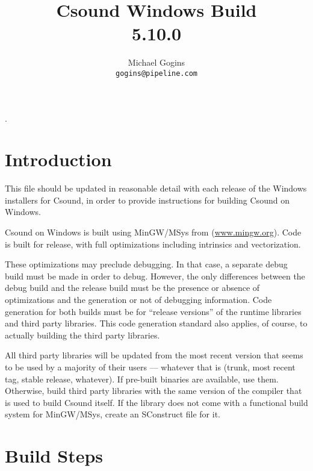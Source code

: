 \documentclass[11pt,letterpaper,onecolumn]{scrartcl}
\begin{document}
\begin{sloppypar}

.
\title{Csound Windows Build \\ 5.10.0}

\author{Michael Gogins \\ \texttt{gogins@pipeline.com}}
\maketitle

\section{Introduction}
\label{sec:Introduction}

This file should be updated in reasonable detail with each release of the Windows installers for Csound, in order to provide instructions for building Csound on Windows.

Csound on Windows is built using MinGW/MSys from (\url{www.mingw.org}). Code is built for release, with full optimizations including intrinsics and vectorization.  

These optimizations may preclude debugging. In that case, a separate debug build must be made in order to debug. However, the only differences between the debug build and the release build must be the presence or absence of optimizations and the generation or not of debugging information. Code generation for both builds must be for ``release versions'' of the runtime libraries and third party libraries. This code generation standard also applies, of course, to actually building the third party libraries.

All third party libraries will be updated from the most recent version that seems to be used by a majority of their users --- whatever that is (trunk, most recent tag, stable release, whatever). If pre-built binaries are available, use them. Otherwise, build third party libraries with the same version of the compiler that is used to build Csound itself. If the library does not come with a functional build system for MinGW/MSys, create an SConstruct file for it.

\section{Build Steps}
\label{sec:BuildSteps}


\end{sloppypar}
\end{document}
